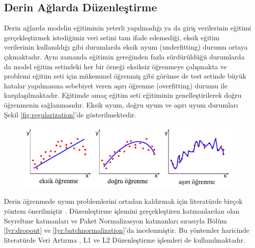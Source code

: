 \subsection{Derin Ağlarda Düzenleştirme}
Derin ağlarda modelin eğitiminin yeterli yapılmadığı ya da giriş verilerinin eğitimi gerçekleştirmek istediğimiz veri setini tam ifade edemediği, eksik eğitim verilerinin kullanıldığı gibi durumlarda eksik uyum (underfitting) durumu ortaya çıkmaktadır. Aynı zamanda eğitimin gereğinden fazla sürdürüldüğü durumlarda da model eğitim setindeki her bir örneği eksiksiz öğrenmeye çalışmakta ve problemi eğitim seti için mükemmel öğrenmiş gibi görünse de test setinde büyük hatalar yapılmasına sebebiyet veren aşırı öğrenme (overfitting) durumu ile karşılaşılmaktadır. Eğitimde amaç eğitim seti eğitiminin genelleştirilerek doğru öğrenmenin sağlanmasıdır. Eksik uyum, doğru uyum ve aşırı uyum durumları Şekil \ref{fig:regularization}'de gösterilmektedir.
\begin{figure}[h!]
	\begin{center}
		\vspace{0.4cm}
		{
			\vspace{0.4cm}
			\includegraphics[scale=0.65]{Yapilan-Calismalar/Figures/regularization.pdf}
		}
	\end{center}
\end{figure}

Derin öğrenmede uyum problemlerini ortadan kaldırmak için literatürde birçok yöntem önerilmiştir \cite{girosi1995regularization}. Düzenleştirme işlemini gerçekleştiren katmanlardan olan Seyreltme katmanları ve Paket Normalizasyon katmanları sırasıyla Bölüm \ref{lyr:dropout} ve \ref{lyr:batchnormalization}'da incelenmiştir. Bu yöntemler haricinde literatürde Veri Artırma \cite{shorten2019survey}, L1 ve L2 Düzenleştirme \cite{ng2004feature} işlemleri de kullanılmaktadır.

